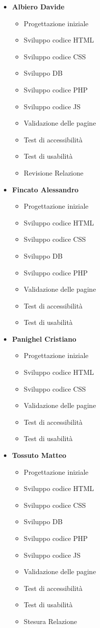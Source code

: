 \begin{itemize}	
	\item \textbf{Albiero Davide}
	\begin{itemize}
		\item Progettazione iniziale
		\item Sviluppo codice HTML
		\item Sviluppo codice CSS
		\item Sviluppo DB
		\item Sviluppo codice PHP
		\item Sviluppo codice JS
		\item Validazione delle pagine
		\item Test di accessibilità
		\item Test di usabilità
		\item Revisione Relazione
	\end{itemize}	
	\item \textbf{Fincato Alessandro}
	\begin{itemize}
		\item Progettazione iniziale
		\item Sviluppo codice HTML
		\item Sviluppo codice CSS
		\item Sviluppo DB
		\item Sviluppo codice PHP
		\item Validazione delle pagine
		\item Test di accessibilità
		\item Test di usabilità
	\end{itemize}	
	\item \textbf{Panighel Cristiano}
	\begin{itemize}
		\item Progettazione iniziale
		\item Sviluppo codice HTML
		\item Sviluppo codice CSS
		\item Validazione delle pagine
		\item Test di accessibilità
		\item Test di usabilità
	\end{itemize}	
	\item \textbf{Tossuto Matteo}
	\begin{itemize}
		\item Progettazione iniziale
		\item Sviluppo codice HTML
		\item Sviluppo codice CSS
		\item Sviluppo DB
		\item Sviluppo codice PHP
		\item Sviluppo codice JS
		\item Validazione delle pagine
		\item Test di accessibilità
		\item Test di usabilità
		\item Stesura Relazione
	\end{itemize}
\end{itemize}

